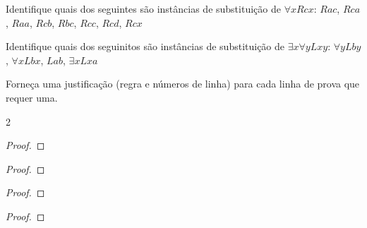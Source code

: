 \solutions
\problempart
\label{pr.subinstanceQL}
\begin{earg}
\item Identifique quais dos seguintes são instâncias de substituição de $\forall x Rcx$: $Rac$, $Rca$, $Raa$, $Rcb$, $Rbc$, $Rcc$, $Rcd$, $Rcx$
\item Identifique quais dos seguinitos são instâncias de substituição de $\exists x\forall y Lxy$:
$\forall y Lby$, $\forall x Lbx$, $Lab$, $\exists x Lxa$
\end{earg}



\newpage
\solutions
\problempart
\label{pr.justifyQLproof}
Forneça uma justificação (regra e números de linha) para cada linha de prova que requer uma.
\begin{multicols}{2}
\begin{proof}
	\open
	\close
{} {}
\end{proof}

\begin{proof}
 {}
 {}
\end{proof}


\begin{proof}
\open
\close
{}
\end{proof}





\begin{proof}
	\open
	\close
{} {}
\end{proof}
\end{multicols}

